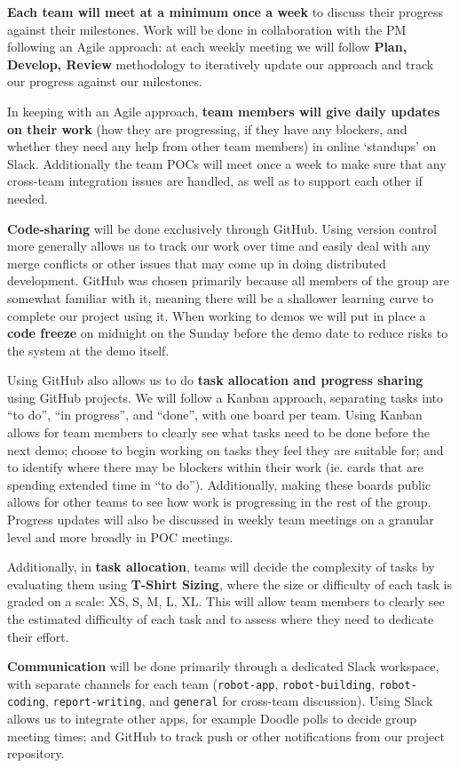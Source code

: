 \documentclass{article}
\begin{document}
{\bf Each team will meet at a minimum once a week} to discuss their progress against their milestones. Work will be done in collaboration with the PM following an Agile approach: at each weekly meeting we will follow {\bf Plan, Develop, Review} methodology to iteratively update our approach and track our progress against our milestones.

In keeping with an Agile approach, {\bf team members will give daily updates on their work} (how they are progressing, if they have any blockers, and whether they need any help from other team members) in online `standups' on Slack. Additionally the team POCs will meet once a week to make sure that any cross-team integration issues are handled, as well as to support each other if needed. 

{\bf Code-sharing} will be done exclusively through GitHub. Using version control more generally allows us to track our work over time and easily deal with any merge conflicts or other issues that may come up in doing distributed development. GitHub was chosen primarily because all members of the group are somewhat familiar with it, meaning there will be a shallower learning curve to complete our project using it. When working to demos we will put in place a {\bf code freeze} on midnight on the Sunday before the demo date to reduce risks to the system at the demo itself. 

Using GitHub also allows us to do {\bf task allocation and progress sharing} using GitHub projects. We will follow a Kanban approach, separating tasks into ``to do'', ``in progress'', and ``done'', with one board per team. Using Kanban allows for team members to clearly see what tasks need to be done before the next demo; choose to begin working on tasks they feel they are suitable for; and to identify where there may be blockers within their work (ie. cards that are spending extended time in ``to do''). Additionally, making these boards public allows for other teams to see how work is progressing in the rest of the group. Progress updates will also be discussed in weekly team meetings on a granular level and more broadly in POC meetings.

Additionally, in {\bf task allocation}, teams will decide the complexity of tasks by evaluating them using {\bf T-Shirt Sizing}, where the size or difficulty of each task is graded on a scale: XS, S, M, L, XL. This will allow team members to clearly see the estimated difficulty of each task and to assess where they need to dedicate their effort. 

{\bf Communication} will be done primarily through a dedicated Slack workspace, with separate channels for each team ({\tt robot-app}, {\tt robot-building}, {\tt robot-coding}, {\tt report-writing}, and {\tt general} for cross-team discussion). Using Slack allows us to integrate other apps, for example Doodle polls to decide group meeting times; and GitHub to track push or other notifications from our project repository. 




\end{document}

